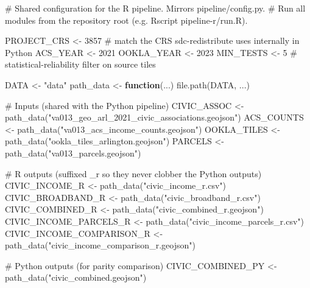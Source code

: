\documentclass[
  letterpaper,
  DIV=11,
  numbers=noendperiod]{scrreprt}
\newenvironment{Shaded}{\begin{snugshade}}{\end{snugshade}}
\newcommand{\CommentTok}[1]{\textcolor[rgb]{0.37,0.37,0.37}{#1}}
\newcommand{\ControlFlowTok}[1]{\textcolor[rgb]{0.00,0.23,0.31}{\textbf{#1}}}
\newcommand{\DecValTok}[1]{\textcolor[rgb]{0.68,0.00,0.00}{#1}}
\newcommand{\FunctionTok}[1]{\textcolor[rgb]{0.28,0.35,0.67}{#1}}
\newcommand{\NormalTok}[1]{\textcolor[rgb]{0.00,0.23,0.31}{#1}}
\newcommand{\OtherTok}[1]{\textcolor[rgb]{0.00,0.23,0.31}{#1}}
\newcommand{\StringTok}[1]{\textcolor[rgb]{0.13,0.47,0.30}{#1}}
\begin{document}
\begin{Shaded}
\begin{Highlighting}[]
\CommentTok{\# Shared configuration for the R pipeline. Mirrors pipeline/config.py.}
\CommentTok{\# Run all modules from the repository root (e.g. \textasciigrave{}Rscript pipeline{-}r/run.R\textasciigrave{}).}

\NormalTok{PROJECT\_CRS }\OtherTok{\textless{}{-}} \DecValTok{3857}   \CommentTok{\# match the CRS sdc{-}redistribute uses internally in Python}
\NormalTok{ACS\_YEAR    }\OtherTok{\textless{}{-}} \DecValTok{2021}
\NormalTok{OOKLA\_YEAR  }\OtherTok{\textless{}{-}} \DecValTok{2023}
\NormalTok{MIN\_TESTS   }\OtherTok{\textless{}{-}} \DecValTok{5}      \CommentTok{\# statistical{-}reliability filter on source tiles}

\NormalTok{DATA }\OtherTok{\textless{}{-}} \StringTok{"data"}
\NormalTok{path\_data }\OtherTok{\textless{}{-}} \ControlFlowTok{function}\NormalTok{(...) }\FunctionTok{file.path}\NormalTok{(DATA, ...)}

\CommentTok{\# Inputs (shared with the Python pipeline)}
\NormalTok{CIVIC\_ASSOC }\OtherTok{\textless{}{-}} \FunctionTok{path\_data}\NormalTok{(}\StringTok{"va013\_geo\_arl\_2021\_civic\_associations.geojson"}\NormalTok{)}
\NormalTok{ACS\_COUNTS  }\OtherTok{\textless{}{-}} \FunctionTok{path\_data}\NormalTok{(}\StringTok{"va013\_acs\_income\_counts.geojson"}\NormalTok{)}
\NormalTok{OOKLA\_TILES }\OtherTok{\textless{}{-}} \FunctionTok{path\_data}\NormalTok{(}\StringTok{"ookla\_tiles\_arlington.geojson"}\NormalTok{)}
\NormalTok{PARCELS     }\OtherTok{\textless{}{-}} \FunctionTok{path\_data}\NormalTok{(}\StringTok{"va013\_parcels.geojson"}\NormalTok{)}

\CommentTok{\# R outputs (suffixed \_r so they never clobber the Python outputs)}
\NormalTok{CIVIC\_INCOME\_R            }\OtherTok{\textless{}{-}} \FunctionTok{path\_data}\NormalTok{(}\StringTok{"civic\_income\_r.csv"}\NormalTok{)}
\NormalTok{CIVIC\_BROADBAND\_R         }\OtherTok{\textless{}{-}} \FunctionTok{path\_data}\NormalTok{(}\StringTok{"civic\_broadband\_r.csv"}\NormalTok{)}
\NormalTok{CIVIC\_COMBINED\_R          }\OtherTok{\textless{}{-}} \FunctionTok{path\_data}\NormalTok{(}\StringTok{"civic\_combined\_r.geojson"}\NormalTok{)}
\NormalTok{CIVIC\_INCOME\_PARCELS\_R    }\OtherTok{\textless{}{-}} \FunctionTok{path\_data}\NormalTok{(}\StringTok{"civic\_income\_parcels\_r.csv"}\NormalTok{)}
\NormalTok{CIVIC\_INCOME\_COMPARISON\_R }\OtherTok{\textless{}{-}} \FunctionTok{path\_data}\NormalTok{(}\StringTok{"civic\_income\_comparison\_r.geojson"}\NormalTok{)}

\CommentTok{\# Python outputs (for parity comparison)}
\NormalTok{CIVIC\_COMBINED\_PY }\OtherTok{\textless{}{-}} \FunctionTok{path\_data}\NormalTok{(}\StringTok{"civic\_combined.geojson"}\NormalTok{)}
\end{Highlighting}
\end{Shaded}
\end{document}
